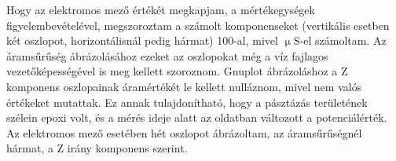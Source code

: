 Hogy az elektromos mező értékét megkapjam, a mértékegységek figyelembevételével, megszoroztam a számolt komponenseket (vertikális esetben két oszlopot, horizontálisnál pedig hármat) 100-al, mivel $\upmu$S-el számoltam. Az áramsűrűség ábrázolásához ezeket az oszlopokat még a víz fajlagos vezetőképességével is meg kellett szoroznom. Gnuplot ábrázoláshoz a Z komponens oszlopainak áramértékét le kellett nulláznom, mivel nem valós értékeket mutattak. Ez annak tulajdonítható, hogy a pásztázás területének szélein epoxi volt, és a mérés ideje alatt az oldatban változott a potenciálérték. Az elektromos mező esetében hét oszlopot ábrázoltam, az áramsűrűségnél hármat, a Z irány komponens szerint.
